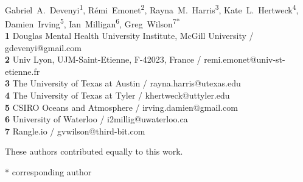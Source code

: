 \documentclass[10pt,letterpaper]{article}
\date{}
\begin{document}
\vspace*{0.2in}

\begin{flushleft}
{\Large
\textbf{} %
}
\newline
\\
{Gabriel~A.~Devenyi}\textsuperscript{1{\ddag}},
{R\'{e}mi~Emonet}\textsuperscript{2{\ddag}},
{Rayna~M.~Harris}\textsuperscript{3{\ddag}},
{Kate~L.~Hertweck}\textsuperscript{4{\ddag}},
{Damien~Irving}\textsuperscript{5{\ddag}},
{Ian~Milligan}\textsuperscript{6{\ddag}},
{Greg~Wilson}\textsuperscript{7{\ddag}*}
\\
\bigskip
\textbf{1} Douglas Mental Health University Institute, McGill University / gdevenyi@gmail.com \\
\textbf{2} Univ Lyon, UJM-Saint-Etienne, F-42023, France / remi.emonet@univ-st-etienne.fr \\
\textbf{3} The University of Texas at Austin / rayna.harris@utexas.edu \\
\textbf{4} The University of Texas at Tyler / khertweck@uttyler.edu \\
\textbf{5} CSIRO Oceans and Atmosphere / irving.damien@gmail.com \\
\textbf{6} University of Waterloo / i2millig@uwaterloo.ca \\
\textbf{7} Rangle.io / gvwilson@third-bit.com \\

\bigskip

%
%
{\ddag} These authors contributed equally to this work.





* corresponding author

\end{flushleft}
\end{document}
